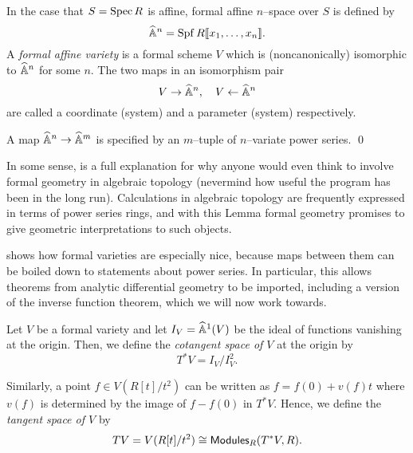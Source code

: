 \begin{definition}
In the case that $S = \operatorname{Spec} R$ is affine, formal affine $n$--space over $S$ is defined by \[\widehat{\mathbb{A}}^n = \operatorname{Spf} R\llbracket x_1, \ldots, x_n\rrbracket.\]  A \textit{formal affine variety} is a formal scheme $V$ which is (noncanonically) isomorphic to $\widehat{\mathbb{A}}^n$ for some $n$.  The two maps in an isomorphism pair \[V \to \widehat{\mathbb{A}}^n, \quad V \leftarrow \widehat{\mathbb{A}}^n\] are called a coordinate (system) and a parameter (system) respectively.
\end{definition}

\begin{lemma}\label{MapsOfFVarsArePowerSeries}
A map $\widehat{\mathbb{A}}^n \to \widehat{\mathbb{A}}^m$ is specified by an $m$--tuple of $n$--variate power series. \qed {}
\end{lemma}

\begin{remark}
In some sense,  is a full explanation for why anyone would even think to involve formal geometry in algebraic topology (nevermind how useful the program has been in the long run).  Calculations in algebraic topology are frequently expressed in terms of power series rings, and with this Lemma formal geometry promises to give geometric interpretations to such objects.
\end{remark}

 shows how formal varieties are especially nice, because maps between them can be boiled down to statements about power series.  In particular, this allows theorems from analytic differential geometry to be imported, including a version of the inverse function theorem, which we will now work towards.

\begin{definition}
Let $V$ be a formal variety and let $I_V = \widehat{\mathbb{A}}^1(V)$ be the ideal of functions vanishing at the origin.  Then, we define the \textit{cotangent space of $V$} at the origin by \[T^* V = I_V / I_V^2.\]
\end{definition}

\begin{definition}
Similarly, a point $f \in V(R[t] / t^2)$ can be written as $f = f(0) + v(f) t$ where $v(f)$ is determined by the image of $f - f(0)$ in $T^* V$.  Hence, we define the \textit{tangent space of $V$} by \[TV = V(R[t] / t^2) \cong \mathsf{Modules}_R(T^* V, R).\]
\end{definition}

